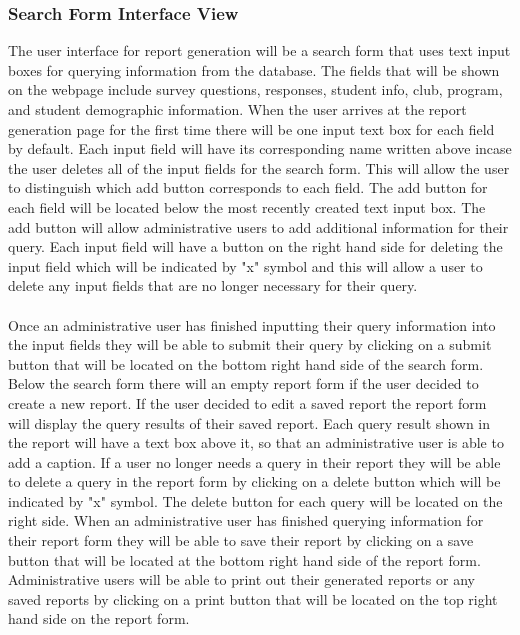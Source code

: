 \subsubsection{Search Form Interface View}
The user interface for report generation will be a search form that uses text input boxes for querying information from the database. The fields that will be shown on the webpage include survey questions, responses, student info, club, program, and student demographic information. When the user arrives at the report generation page for the first time there will be one input text box for each field by default. Each input field will have its corresponding name written above incase the user deletes all of the input fields for the search form. This will allow the user to distinguish which add button corresponds to each field. The add button for each field will be located below the most recently created text input box. The add button will allow administrative users to add additional information for their query. Each input field will have a button on the right hand side for deleting the input field which will be indicated by "x" symbol and this will allow a user to delete any input fields that are no longer necessary for their query. 
\\ \\
Once an administrative user has finished inputting their query information into the input fields they will be able to submit their query by clicking on a submit button that will be located on the bottom right hand side of the search form. Below the search form there will an empty report form if the user decided to create a new report. If the user decided to edit a saved report the report form will display the query results of their saved report. Each query result shown in the report will have a text box above it, so that an administrative user is able to add a caption. If a user no longer needs a query in their report they will be able to delete a query in the report form by clicking on a delete button which will be indicated by "x" symbol. The delete button for each query will be located on the right side. When an administrative user has finished querying information for their report form they will be able to save their report by clicking on a save button that will be located at the bottom right hand side of the report form. Administrative users will be able to print out their generated reports or any saved reports by clicking on a print button that will be located on the top right hand side on the report form. 

